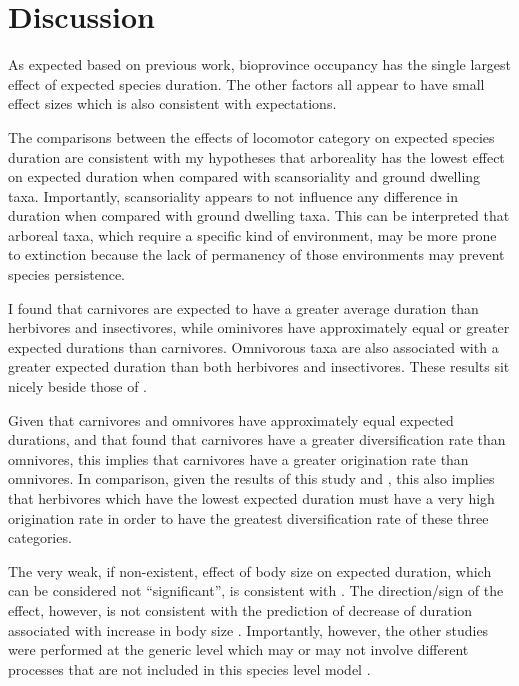 \documentclass[12pt,letterpaper]{article}
\begin{document}
\section{Discussion}

As expected based on previous work, bioprovince occupancy has the single largest effect of expected species duration. The other factors all appear to have small effect sizes which is also consistent with expectations.

The comparisons between the effects of locomotor category on expected species duration are consistent with my hypotheses that arboreality has the lowest effect on expected duration when compared with scansoriality and ground dwelling taxa. Importantly, scansoriality appears to not influence any difference in duration when compared with ground dwelling taxa. This can be interpreted that arboreal taxa, which require a specific kind of environment, may be more prone to extinction because the lack of permanency of those environments may prevent species persistence. 

I found that carnivores are expected to have a greater average duration than herbivores and insectivores, while ominivores have approximately equal or greater expected durations than carnivores. Omnivorous taxa are also associated with a greater expected duration than both herbivores and insectivores. These results sit nicely beside those of \citet{Price2012}.

Given that carnivores and omnivores have approximately equal expected durations, and that \citet{Price2012} found that carnivores have a greater diversification rate than omnivores, this implies that carnivores have a greater origination rate than omnivores. In comparison, given the results of this study and \citet{Price2012}, this also implies that herbivores which have the lowest expected duration must have a very high origination rate in order to have the greatest diversification rate of these three categories.

The very weak, if non-existent, effect of body size on expected duration, which can be considered not ``significant'', is consistent with \citet{Tomiya2013}. The direction/sign of the effect, however, is not consistent with the prediction of decrease of duration associated with increase in body size \citep{Liow2008}. Importantly, however, the other studies were performed at the generic level which may or may not involve different processes that are not included in this species level model \citep{Liow2008,Tomiya2013}.
\end{document}
